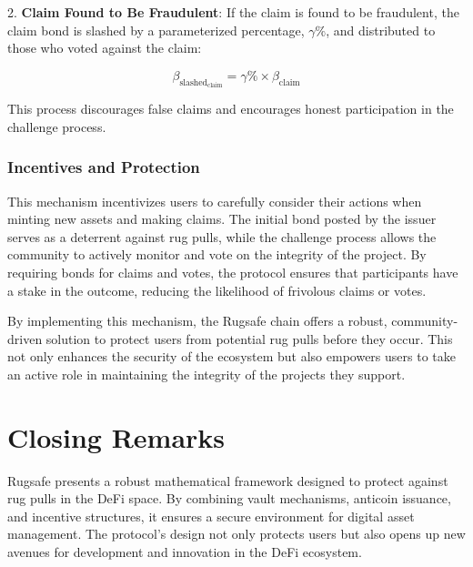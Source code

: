 \documentclass{article}
\begin{document}
2. \textbf{Claim Found to Be Fraudulent}: If the claim is found to be fraudulent, the claim bond is slashed by a parameterized percentage, \(\gamma\%\), and distributed to those who voted against the claim:

\[
\beta_{\text{slashed}_{\text{claim}}} = \gamma\% \times \beta_{\text{claim}}
\]

This process discourages false claims and encourages honest participation in the challenge process.

\subsubsection{Incentives and Protection}

This mechanism incentivizes users to carefully consider their actions when minting new assets and making claims. The initial bond posted by the issuer serves as a deterrent against rug pulls, while the challenge process allows the community to actively monitor and vote on the integrity of the project. By requiring bonds for claims and votes, the protocol ensures that participants have a stake in the outcome, reducing the likelihood of frivolous claims or votes.

By implementing this mechanism, the Rugsafe chain offers a robust, community-driven solution to protect users from potential rug pulls before they occur. This not only enhances the security of the ecosystem but also empowers users to take an active role in maintaining the integrity of the projects they support.















\section{Closing Remarks}
Rugsafe presents a robust mathematical framework designed to protect against rug pulls in the DeFi space. By combining vault mechanisms, anticoin issuance, and incentive structures, it ensures a secure environment for digital asset management. The protocol's design not only protects users but also opens up new avenues for development and innovation in the DeFi ecosystem.
\end{document}
